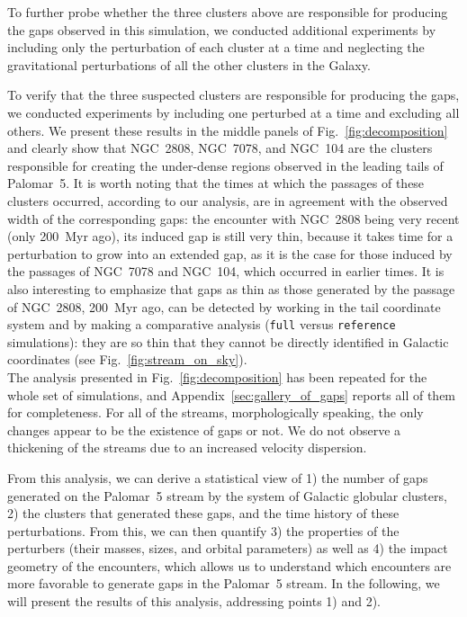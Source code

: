 \documentclass{aa}
\begin{document}
    To further probe whether the three clusters above are responsible for producing the gaps observed in this simulation, we conducted additional experiments by including only the perturbation of each cluster at a time and neglecting the gravitational perturbations of all the other clusters in the Galaxy.
    
    To verify that the three suspected clusters are responsible for producing the gaps, we conducted experiments by including one perturbed at a time and excluding all others. We present these results in the middle panels of Fig.~\ref{fig:decomposition} and clearly show that NGC~2808, NGC~7078, and NGC~104 are the clusters responsible for creating the under-dense regions observed in the leading tails of Palomar~5. It is worth noting that the times at which the passages of these clusters occurred, according to our analysis, are in agreement with the observed width of the corresponding gaps: the encounter with NGC~2808 being very recent (only 200~Myr ago), its induced gap is still very thin, because it takes time for a perturbation to grow into an extended gap, as it is the case for those induced by the passages of  NGC~7078 and NGC~104, which occurred in earlier times. It is also interesting to emphasize that gaps as thin as those generated by the passage of NGC~2808, 200~Myr ago, can be detected by working in the tail coordinate system and by making a comparative analysis (\texttt{full} versus \texttt{reference} simulations): they are so thin that they cannot be directly identified in Galactic coordinates (see Fig.~\ref{fig:stream_on_sky}).\\

    The analysis presented in Fig.~\ref{fig:decomposition} has been repeated for the whole set of simulations, and Appendix~\ref{sec:gallery_of_gaps} reports all of them for completeness. For all of the streams, morphologically speaking, the only changes appear to be the existence of gaps or not. We do not observe a thickening of the streams due to an increased velocity dispersion. 
    
    From this analysis, we can derive a statistical view of 1) the number of gaps generated on the Palomar~5 stream by the system of Galactic globular clusters, 2) the clusters that generated these gaps, and the time history of these perturbations. From this, we can then quantify 3) the properties of the perturbers (their masses, sizes, and orbital parameters) as well as 4) the impact geometry of the encounters, which allows us to understand which encounters are more favorable to generate gaps in the Palomar~5 stream. In the following, we will present the results of this analysis, addressing points 1) and 2).
\end{document}
